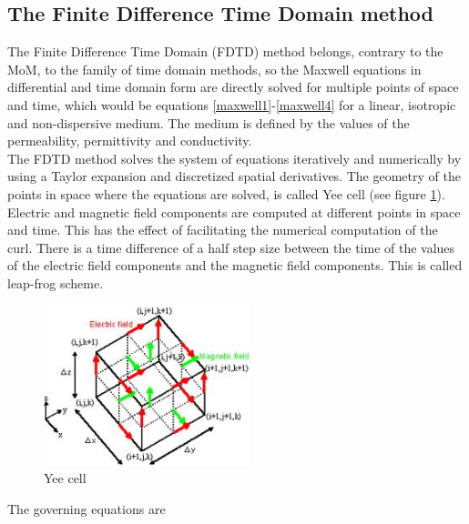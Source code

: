 \documentclass[a4paper,11pt]{report}
\begin{document}
\subsection{The Finite Difference Time Domain method}
The Finite Difference Time Domain (FDTD) method belongs, contrary to the MoM, to the family of time domain methods, so the Maxwell equations in differential and time domain form are directly solved for multiple points of space and time, which would be equations \ref{maxwell1}-\ref{maxwell4} for a linear, isotropic and non-dispersive medium. The medium is defined by the values of the permeability, permittivity and conductivity.\\

The FDTD method solves the system of equations iteratively and numerically by using a Taylor expansion and discretized spatial derivatives. The geometry of the points in space where the equations are solved, is called Yee cell (see figure \ref{fig:yee}).\\

Electric and magnetic field components are computed at different points in space and time. This has the effect of facilitating the numerical computation of the curl. There is a time difference of a half step size between the time of the values of the electric field components and the magnetic field components. This is called leap-frog scheme.\\


\begin{figure}
\begin{center}
 \includegraphics[width=6cm]{yee}
\caption{Yee cell}
\label{fig:yee}
\end{center}
\end{figure}

The governing equations are
\end{document}
